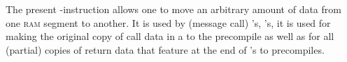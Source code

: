 The present \mmuMod{}-instruction allows one to move an arbitrary amount of data from one \textsc{ram} segment to another.
It is used by (message call) 's, 's, it is used for making the original copy of call data in a  to the \instIdentity{} precompile as well as for all (partial) copies of return data that feature at the end of 's to precompiles.
